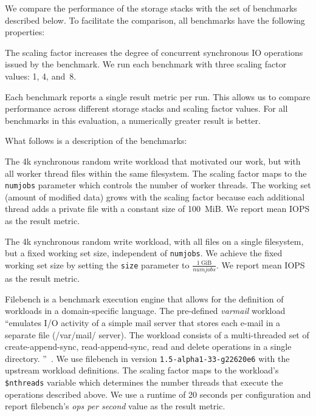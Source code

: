 \documentclass[12pt,a4paper,twoside]{book}
\begin{document}
{We compare the performance of the storage stacks with the set of benchmarks described below.
To facilitate the comparison, all benchmarks have the following properties:
\begin{description}[noitemsep,leftmargin=1.5cm,labelindent=1cm]
    \item[Scaling Factor] The scaling factor increases the degree of concurrent synchronous IO operations issued by the benchmark.
        We run each benchmark with three scaling factor values: 1, 4, and~8.
    \item[Result Metric] Each benchmark reports a single result metric per run.
        This allows us to compare performance across different storage stacks and scaling factor values.
        For all benchmarks in this evaluation, a numerically greater result is better.
\end{description}
What follows is a description of the benchmarks:
\begin{description}[noitemsep,leftmargin=1.5cm,labelindent=1cm]
    \item[fio-growing] The 4k synchronous random write workload that motivated our work, but with all worker thread files within the same filesystem.
        The scaling factor maps to the \lstinline{numjobs} parameter which controls the number of worker threads.
        The working set (amount of modified data) grows with the scaling factor because each additional thread adds a private file with a constant size of 100~MiB.
        We report mean IOPS as the result metric.

    \item[fio-fixed] The 4k synchronous random write workload, with all files on a single filesystem, but a fixed working set size, independent of \lstinline{numjobs}.
        We achieve the fixed working set size by setting the \lstinline{size} parameter to $\frac{1~\text{GiB}}{numjobs}$.
        We report mean IOPS as the result metric.

    \item[filebench varmail] Filebench is a benchmark execution engine that allows for the definition of workloads in a domain-specific language.
        The pre-defined \textit{varmail} workload
        ``emulates I/O activity of a simple mail server that stores each e-mail in a separate file (/var/mail/ server).
          The workload consists of a multi-threaded set of create-append-sync, read-append-sync, read and delete operations in a single directory.
        ''~\cite{FilebenchGitHubWiki}.
        We use filebench in version \lstinline{1.5-alpha1-33-g22620e6} with the upstream workload definitions.
        The scaling factor maps to the workload's \lstinline{$nthreads} variable which determines the number threads that execute the operations described above.
        We use a runtime of 20 seconds per configuration and report filebench's \textit{ops per second} value as the result metric.


\end{description}}
\end{document}
